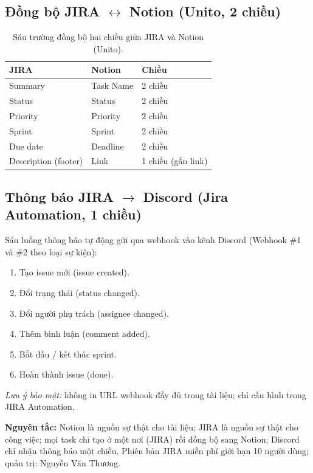\subsection{Đồng bộ JIRA $\leftrightarrow$ Notion (Unito, 2 chiều)}
\begin{table}[H]
    \centering
    \small
    \caption{Sáu trường đồng bộ hai chiều giữa JIRA và Notion (Unito).}
    \label{tab:unito}
    \begin{tabular}{lll}
        \hline
        \textbf{JIRA}        & \textbf{Notion} & \textbf{Chiều}     \\
        \hline
        Summary              & Task Name       & 2 chiều            \\
        Status               & Status          & 2 chiều            \\
        Priority             & Priority        & 2 chiều            \\
        Sprint               & Sprint          & 2 chiều            \\
        Due date             & Deadline        & 2 chiều            \\
        Description (footer) & Link            & 1 chiều (gắn link) \\
        \hline
    \end{tabular}
\end{table}

\subsection{Thông báo JIRA $\rightarrow$ Discord (Jira Automation, 1 chiều)}
Sáu luồng thông báo tự động gửi qua webhook vào kênh Discord (Webhook \#1 và \#2 theo loại sự kiện):
\begin{enumerate}
    \item Tạo issue mới (issue created).
    \item Đổi trạng thái (status changed).
    \item Đổi người phụ trách (assignee changed).
    \item Thêm bình luận (comment added).
    \item Bắt đầu / kết thúc sprint.
    \item Hoàn thành issue (done).
\end{enumerate}
\textit{Lưu ý bảo mật:} không in URL webhook đầy đủ trong tài liệu; chỉ cấu hình trong JIRA Automation.

\textbf{Nguyên tắc:} Notion là nguồn sự thật cho tài liệu; JIRA là nguồn sự thật cho công việc; mọi task chỉ tạo ở một nơi (JIRA) rồi đồng bộ sang Notion; Discord chỉ nhận thông báo một chiều. Phiên bản JIRA miễn phí giới hạn 10 người dùng; quản trị: Nguyễn Văn Thương.
